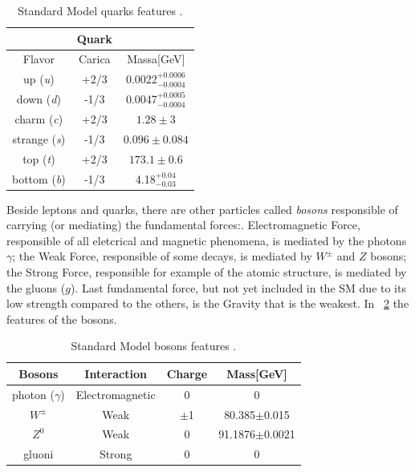 \begin{table}[htbp]	
	\begin{center}
		\begin{tabular}{|ccc|}
			\hline    & \textbf{Quark} &   \\
			\hline   Flavor & Carica & Massa[GeV]  \\
			\hline
			\hline
			up (\emph{u}) & +2/3 & 0.0022$^{+0.0006}_{-0.0004}$ \\   
			down (\emph{d}) & -1/3 & 0.0047$^{+0.0005}_{-0.0004}$ \\
			\hline
			charm (\emph{c}) & +2/3 & $1.28\pm3$ \\
			strange (\emph{s}) & -1/3 & $0.096\pm0.084$ \\
			\hline
			top (\emph{t}) & +2/3 & $173.1\pm0.6$ \\
			bottom (\emph{b}) & -1/3 & 4.18$^{+0.04}_{-0.03}$ \\   
			\hline
			\hline
		\end{tabular}
	\end{center}
	\caption{Standard Model quarks features \cite{PDG}.}
	\label{quarkSM}
\end{table}

Beside leptons and quarks, there are other particles called \textit{bosons} responsible of carrying (or mediating) the fundamental forces:. Electromagnetic Force, responsible of all eletcrical and magnetic phenomena, is mediated by the photons {$\gamma$}; the Weak Force, responsible of some decays, is mediated by $W^{\pm}$ and $Z$ bosons; the Strong Force, responsible for example of the atomic structure, is mediated by the gluons ($g$). Last fundamental force, but not yet included in the SM due to its low strength compared to the others, is the Gravity that is the weakest. In \tablename~\ref{bosonsSM} the features of the bosons.
\begin{table}[htbp]	
	\begin{center}
		\begin{tabular}{|cccc|}
			\hline    Bosons & Interaction & Charge & Mass[GeV]  \\
			\hline
			\hline
			 photon ($\gamma$) &  Electromagnetic & 0 & 0   \\
			 \hline
			 $W^{\pm}$ & Weak & $\pm$1 & 80.385$\pm$0.015   \\
			 \hline 
             	 	 $Z^{0}$ & Weak & 0 & 91.1876$\pm$0.0021   \\
			 \hline
			 gluoni & Strong & 0 & 0 \\
			\hline
			\hline
		\end{tabular}
	\end{center}
	\caption{Standard Model bosons features \cite{PDG}.}
	\label{bosonsSM}
\end{table}


